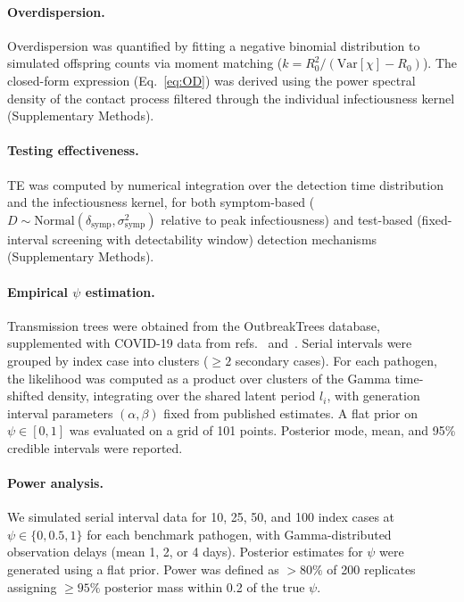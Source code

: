 \documentclass[10pt]{article}
\begin{document}
\paragraph{Overdispersion.}
Overdispersion was quantified by fitting a negative binomial distribution to simulated offspring counts via moment matching ($k = R_0^2 / (\text{Var}[\chi] - R_0)$). The closed-form expression (Eq.~\ref{eq:OD}) was derived using the power spectral density of the contact process filtered through the individual infectiousness kernel (Supplementary Methods).

\paragraph{Testing effectiveness.}
TE was computed by numerical integration over the detection time distribution and the infectiousness kernel, for both symptom-based ($D \sim \text{Normal}(\delta_\text{symp}, \sigma_\text{symp}^2)$ relative to peak infectiousness) and test-based (fixed-interval screening with detectability window) detection mechanisms (Supplementary Methods).

\paragraph{Empirical $\psi$ estimation.}
Transmission trees were obtained from the OutbreakTrees database\citep{taube_outbreaktrees_2022}, supplemented with COVID-19 data from refs.~ and~. Serial intervals were grouped by index case into clusters ($\geq 2$ secondary cases). For each pathogen, the likelihood was computed as a product over clusters of the Gamma time-shifted density, integrating over the shared latent period $l_i$, with generation interval parameters $(\alpha, \beta)$ fixed from published estimates. A flat prior on $\psi \in [0,1]$ was evaluated on a grid of 101 points. Posterior mode, mean, and 95\% credible intervals were reported.

\paragraph{Power analysis.}
We simulated serial interval data for 10, 25, 50, and 100 index cases at $\psi \in \{0, 0.5, 1\}$ for each benchmark pathogen, with Gamma-distributed observation delays (mean 1, 2, or 4 days). Posterior estimates for $\psi$ were generated using a flat prior. Power was defined as $>80\%$ of 200 replicates assigning $\geq 95\%$ posterior mass within 0.2 of the true $\psi$.
\end{document}
